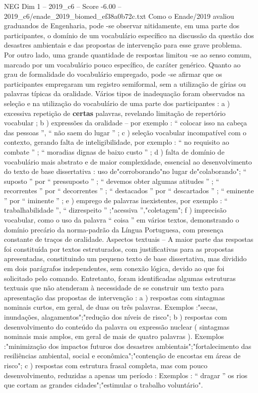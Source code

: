 \begin{textsample}{NEG Dim 1 – 2019\_c6 – Score -6.00 – 2019\_c6/enade\_2019\_biomed\_ef38a0b72c.txt}
Como o Enade/2019 avaliou graduandos de Engenharia, pode -se observar nitidamente, em uma parte dos participantes, o domínio de um vocabulário específico na discussão da questão dos desastres ambientais e das propostas de intervenção para esse grave problema.
Por outro lado, uma grande quantidade de respostas limitou -se ao senso comum, marcado por um vocabulário pouco específico, de caráter genérico.
Quanto ao grau de formalidade do vocabulário empregado, pode -se afirmar que os participantes empregaram um registro semiformal, sem a utilização de gírias ou palavras típicas da oralidade.
Vários tipos de inadequação foram observados na seleção e na utilização do vocabulário de uma parte dos participantes : a ) excessiva repetição de \textbf{certas} palavras, revelando limitação de repertório vocabular ; b ) expressões da oralidade – por exemplo : “ colocar isso na cabeça das pessoas ”, “ não saem do lugar ” ; c ) seleção vocabular incompatível com o contexto, gerando falta de inteligibilidade, por exemplo : “ no requisito ao combate ” ; “ moradias dignas de baixo custo ” ; d ) falta de domínio de vocabulário mais abstrato e de maior complexidade, essencial ao desenvolvimento do texto de base dissertativa : uso de"corroborando"no lugar de"colaborando"; “ suposto ” por “ pressuposto ” ; “ devemos obter algumas atitudes ” ; “ recorrentes ” por “ decorrentes ” ; “ destacados ” por “ descartados ” ; “ eminente ” por “ iminente ” ; e ) emprego de palavras inexistentes, por exemplo : “ trabalhabilidade ”, “ dizrespeito ” ;"acessiva ”,"coletagem"; f ) imprecisão vocabular, como o uso da palavra “ coisa ” em vários textos, demonstrando o domínio precário da norma-padrão da Língua Portuguesa, com presença constante de traços de oralidade.
Aspectos textuais – A maior parte das respostas foi constituída por textos estruturados, com justificativas para as propostas apresentadas, constituindo um pequeno texto de base dissertativa, mas dividido em dois parágrafos independentes, sem conexão lógica, devido ao que foi solicitado pelo comando.
Entretanto, foram identificadas algumas estruturas textuais que não atenderam à necessidade de se construir um texto para apresentação das propostas de intervenção : a ) respostas com sintagmas nominais curtos, em geral, de duas ou três palavras.
Exemplos :"secas, inundações, alagamentos";"redução dos níveis de risco"; b ) respostas com desenvolvimento do conteúdo da palavra ou expressão nuclear ( sintagmas nominais mais amplos, em geral de mais de quatro palavras ).
Exemplos :"minimização dos impactos futuros dos desastres ambientais";"fortalecimento das resiliências ambiental, social e econômica";"contenção de encostas em áreas de risco"; c ) respostas com estrutura frasal completa, mas com pouco desenvolvimento, reduzidas a apenas um período : Exemplos : “ dragar ” os rios que cortam as grandes cidades";"estimular o trabalho voluntário".

\end{textsample}

